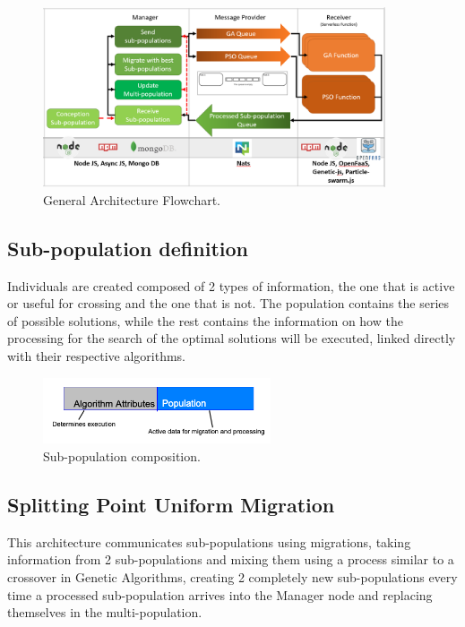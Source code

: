 \documentclass[runningheads]{llncs}
\begin{document}
\begin{figure}[htp]
  \centering
  \includegraphics[width=0.9\textwidth]{img/general diagram architecture 2.png}
  \caption{General Architecture Flowchart.} \label{fig2}
  \end{figure}

\subsection{Sub-population definition}

Individuals are created composed of 2 types of information, the one that is
active or useful for crossing and the one that is not. The population contains
the series of possible solutions, while the rest contains the information on how
the processing for the search of the optimal solutions will be executed, linked
directly with their respective algorithms.

\begin{figure}[htp]
  \centering
  \includegraphics[width=0.6\textwidth]{img/subpopulationDefinition.png}
  \caption{Sub-population composition.} \label{fig3}
  \end{figure}

\subsection{Splitting Point Uniform Migration}

This architecture communicates sub-populations using migrations, taking
information from 2 sub-populations and mixing them using a process similar to a
crossover in Genetic Algorithms, creating 2 completely new sub-populations every
time a processed sub-population arrives into the Manager node and replacing
themselves in the multi-population.
\end{document}
